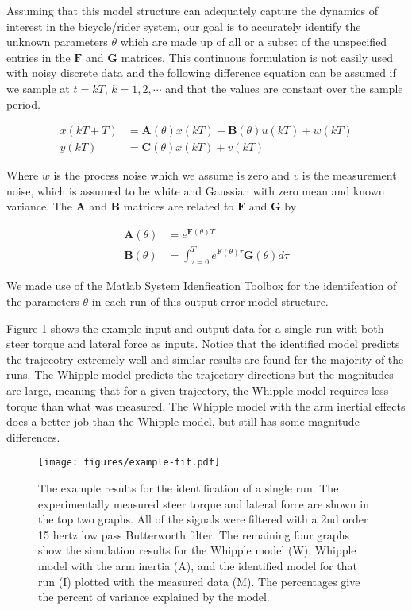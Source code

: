 \documentclass[twocolumn,10pt]{asme2e}
\begin{document}
Assuming that this model structure can adequately capture the dynamics of
interest in the bicycle/rider system, our goal is to accurately identify the
unknown parameters $\theta$ which are made up of all or a subset of the
unspecified entries in the $\mathbf{F}$ and $\mathbf{G}$ matrices. This
continuous formulation is not easily used with noisy discrete data and the
following difference equation can be assumed if we sample at $t=kT$,
$k=1,2,\cdots$ and that the values are constant over the sample period.

\begin{equation}
	\begin{split}
		x(kT + T) & = \mathbf{A}(\theta)x(kT) + \mathbf{B}(\theta)u(kT) + w(kT)\\
		y(kT) & = \mathbf{C}(\theta)x(kT) + v(kT)
	\end{split}
\end{equation}

Where $w$ is the process noise which we assume is zero and $v$ is the
measurement noise, which is assumed to be white and Gaussian with zero mean and
known variance. The $\mathbf{A}$ and $\mathbf{B}$ matrices are related to
$\mathbf{F}$ and $\mathbf{G}$ by

\begin{equation}
	\begin{split}
		\mathbf{A}(\theta) & = e^{\mathbf{F}(\theta)T}\\
		\mathbf{B}(\theta) & = \int_{\tau=0}^T e^{\mathbf{F}(\theta)\tau}
		\mathbf{G}(\theta) d\tau
	\end{split}
\end{equation}

We made use of the Matlab System Idenfication Toolbox for the identifcation of
the parameters $\theta$ in each run of this output error model structure.

Figure \ref{fig:exampleFit} shows the example input and output data for a
single run with both steer torque and lateral force as inputs. Notice that the
identified model predicts the trajecotry extremely well and similar results are
found for the majority of the runs. The Whipple model predicts the trajectory
directions but the magnitudes are large, meaning that for a given trajectory,
the Whipple model requires less torque than what was measured. The Whipple
model with the arm inertial effects does a better job than the Whipple model,
but still has some magnitude differences.

\begin{figure}
	\texttt{[image: figures/example-fit.pdf]}
	\caption{The example results for the identification of a single run. The
	experimentally measured steer torque and lateral force are shown in the top
	two graphs. All of the signals were filtered with a 2nd order 15 hertz low
	pass Butterworth filter. The remaining four graphs show the simulation
	results for the Whipple model (W), Whipple model with the arm inertia (A),
	and the identified model for that run (I) plotted with the measured data (M).
	The percentages give the percent of variance explained by the model.}
	\label{fig:exampleFit}
\end{figure}
\end{document}
